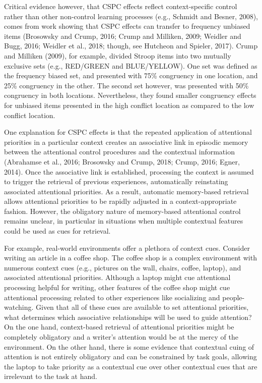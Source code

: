 \documentclass[]{DissertateCUNY}
\begin{document}
Critical evidence however, that CSPC effects reflect context-specific
control rather than other non-control learning processes (e.g., Schmidt
and Besner, 2008), comes from work showing that CSPC effects can
transfer to frequency unbiased items (Brosowsky and Crump, 2016; Crump
and Milliken, 2009; Weidler and Bugg, 2016; Weidler et al., 2018;
though, see Hutcheon and Spieler, 2017). Crump and Milliken (2009), for
example, divided Stroop items into two mutually exclusive sets (e.g.,
RED/GREEN and BLUE/YELLOW). One set was defined as the frequency biased
set, and presented with 75\% congruency in one location, and 25\%
congruency in the other. The second set however, was presented with 50\%
congruency in both locations. Nevertheless, they found smaller
congruency effects for unbiased items presented in the high conflict
location as compared to the low conflict location.

One explanation for CSPC effects is that the repeated application of
attentional priorities in a particular context creates an associative
link in episodic memory between the attentional control procedures and
the contextual information (Abrahamse et al., 2016; Brosowsky and Crump,
2018; Crump, 2016; Egner, 2014). Once the associative link is
established, processing the context is assumed to trigger the retrieval
of previous experiences, automatically reinstating associated
attentional priorities. As a result, automatic memory-based retrieval
allows attentional priorities to be rapidly adjusted in a
context-appropriate fashion. However, the obligatory nature of
memory-based attentional control remains unclear, in particular in
situations when multiple contextual features could be used as cues for
retrieval.

For example, real-world environments offer a plethora of context cues.
Consider writing an article in a coffee shop. The coffee shop is a
complex environment with numerous context cues (e.g., pictures on the
wall, chairs, coffee, laptop), and associated attentional priorities.
Although a laptop might cue attentional processing helpful for writing,
other features of the coffee shop might cue attentional processing
related to other experiences like socializing and people-watching. Given
that all of these cues are available to set attentional priorities, what
determines which associative relationships will be used to guide
attention? On the one hand, context-based retrieval of attentional
priorities might be completely obligatory and a writer's attention would
be at the mercy of the environment. On the other hand, there is some
evidence that contextual cuing of attention is not entirely obligatory
and can be constrained by task goals, allowing the laptop to take
priority as a contextual cue over other contextual cues that are
irrelevant to the task at hand.
\end{document}
